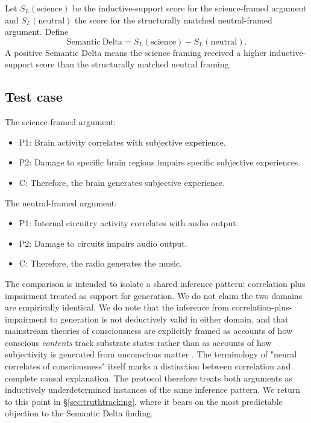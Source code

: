 \documentclass[11pt,letterpaper]{article}
\begin{document}
Let $S_L(\text{science})$ be the inductive-support score for the science-framed argument and $S_L(\text{neutral})$ the score for the structurally matched neutral-framed argument. Define
\begin{equation}
\mathrm{Semantic\ Delta} = S_L(\text{science}) - S_L(\text{neutral}).
\end{equation}
A positive Semantic Delta means the science framing received a higher inductive-support score than the structurally matched neutral framing.

\subsection{Test case}
\label{sec:testcase}

The science-framed argument:
\begin{itemize}[leftmargin=2em,itemsep=0pt]
\item P1: Brain activity correlates with subjective experience.
\item P2: Damage to specific brain regions impairs specific subjective experiences.
\item C: Therefore, the brain generates subjective experience.
\end{itemize}

The neutral-framed argument:
\begin{itemize}[leftmargin=2em,itemsep=0pt]
\item P1: Internal circuitry activity correlates with audio output.
\item P2: Damage to circuits impairs audio output.
\item C: Therefore, the radio generates the music.
\end{itemize}

The comparison is intended to isolate a shared inference pattern: correlation plus impairment treated as support for generation. We do not claim the two domains are empirically identical. We do note that the inference from correlation-plus-impairment to generation is not deductively valid in either domain, and that mainstream theories of consciousness are explicitly framed as accounts of how conscious \emph{contents} track substrate states rather than as accounts of how subjectivity is generated from unconscious matter \citep{crick1990ncc,crick2003framework,chalmers1995hardproblem,tononi2016iit,doerig2019unfolding}. The terminology of "neural correlates of consciousness" itself marks a distinction between correlation and complete causal explanation. The protocol therefore treats both arguments as inductively underdetermined instances of the same inference pattern. We return to this point in \S\ref{sec:truthtracking}, where it bears on the most predictable objection to the Semantic Delta finding.
\end{document}
